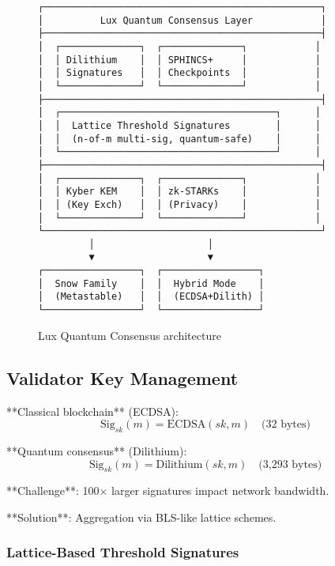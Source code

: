 \documentclass[11pt,letterpaper]{article}
\begin{document}
\begin{figure}[h]
\centering
\begin{verbatim}
┌─────────────────────────────────────────────────┐
│          Lux Quantum Consensus Layer            │
├─────────────────────────────────────────────────┤
│  ┌──────────────┐  ┌──────────────┐            │
│  │ Dilithium    │  │ SPHINCS+     │            │
│  │ Signatures   │  │ Checkpoints  │            │
│  └──────────────┘  └──────────────┘            │
├─────────────────────────────────────────────────┤
│  ┌──────────────────────────────────────┐      │
│  │  Lattice Threshold Signatures        │      │
│  │  (n-of-m multi-sig, quantum-safe)    │      │
│  └──────────────────────────────────────┘      │
├─────────────────────────────────────────────────┤
│  ┌──────────────┐  ┌──────────────┐            │
│  │ Kyber KEM    │  │ zk-STARKs    │            │
│  │ (Key Exch)   │  │ (Privacy)    │            │
│  └──────────────┘  └──────────────┘            │
└─────────────────────────────────────────────────┘
         │                    │
         ▼                    ▼
┌─────────────────┐  ┌─────────────────┐
│  Snow Family    │  │  Hybrid Mode    │
│  (Metastable)   │  │  (ECDSA+Dilith) │
└─────────────────┘  └─────────────────┘
\end{verbatim}
\caption{Lux Quantum Consensus architecture}
\end{figure}

\subsection{Validator Key Management}

**Classical blockchain** (ECDSA):
\begin{equation}
\text{Sig}_{sk}(m) = \text{ECDSA}(sk, m) \quad \text{(32 bytes)}
\end{equation}

**Quantum consensus** (Dilithium):
\begin{equation}
\text{Sig}_{sk}(m) = \text{Dilithium}(sk, m) \quad \text{(3,293 bytes)}
\end{equation}

**Challenge**: 100× larger signatures impact network bandwidth.

**Solution**: Aggregation via BLS-like lattice schemes.

\subsubsection{Lattice-Based Threshold Signatures}
\end{document}
